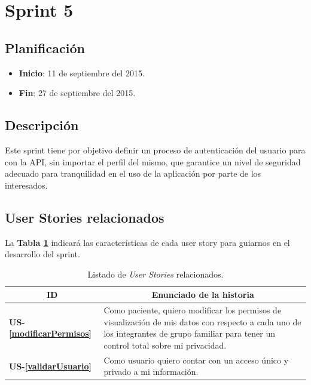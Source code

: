 \section{Sprint 5}%

\subsection{Planificación}
\begin{itemize}
    \item \textbf{Inicio}: 11 de septiembre del 2015.
    \item \textbf{Fin}: 27 de septiembre del 2015.
\end{itemize}


\subsection{Descripción}

Este sprint tiene por objetivo definir un proceso de autenticación del usuario para con la API, sin importar el perfil del mismo, que garantice un nivel de seguridad adecuado para tranquilidad en el uso de la aplicación por parte de los interesados. 

\subsection{User Stories relacionados}
La \textbf{Tabla \ref{US-Sprint5}} indicará las características de cada user story para guiarnos en el desarrollo del sprint.

\begin{table}[h]
    \centering
	\begin{tabular}{|l|p{9cm}|}
	\hline
        \multicolumn{1}{|c|}{\textbf{ID}} &
        \multicolumn{1}{|c|}{\textbf{Enunciado de la historia}} \\          
    \hline
        \textbf{US-\ref{modificarPermisos}} & Como paciente, quiero modificar los permisos de visualización de mis datos con respecto a cada uno de los integrantes de grupo familiar para tener un control total sobre mi privacidad. \\
     \hline 
        \textbf{US-\ref{validarUsuario} } & Como usuario quiero contar con un acceso único y privado a mi información. \\
     \hline 
    \end{tabular}
    \caption{Listado de \textit{User Stories} relacionados.}
    \label{US-Sprint5}
\end{table}

